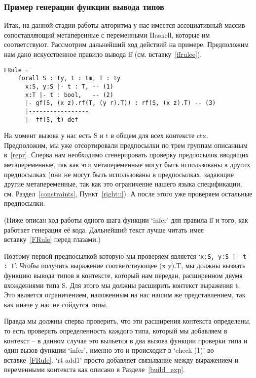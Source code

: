 \subsubsection{Пример генерации функции вывода типов}
Итак, на данной стадии работы алгоритма у нас имеется ассоциативный массив сопоставляющий метаперенные с переменными Haskell, которые им соответствуют. Рассмотрим дальнейший ход действий на примере. Предположим нам дано искусственное правило вывода ff (см. вставку~\ref{ffrulee}).

\begin{lstlisting}[label={ffrulee}, caption={Искусственное правило вывода для конструкции ff},captionpos=b, frame=single, float, floatplacement=H]
FRule =
    forall S : ty, t : tm, T : ty
      x:S, y:S |- t : T, -- (1)
      x:T |- t : bool,   -- (2)
      |- gf(S, (x z).rf(T, (y r).T)) : rf(S, (x z).T) -- (3)
      |-----------------
      |- ff(S, t) def
\end{lstlisting}

На момент вызова у нас есть S и t в общем для всех контексте ctx. Предположим, мы уже отсортировали предпосылки по трем группам описанным в~\ref{repr}. Сперва нам необходимо сгенерировать проверку предпосылок вводящих метапеременные, так как эти метапеременные могут быть использованы в других предпосылках (они не могут быть использованы в предпосылках, задающие другие метапеременные, так как это ограничение нашего языка спецификации, см. Раздел~\ref{constraints}, Пункт~\ref{right::}). А после этого уже проверяем остальные предпосылки.

(Ниже описан ход работы одного шага функции `infer' для правила ff и того, как работает генерация её кода. Дальнейший текст лучше читать имея вставку~\ref{FRule} перед глазами.)

Поэтому первой предпосылкой которую мы проверяем является `\lstinline{x:S, y:S |- t : T}'. Чтобы получить выражение соответствующее (x y).T, мы должны вызвать функцию вывода типов в контексте, который нам передан, расширенном двумя вхождениями типа S. Для этого мы должны расширить контекст выражения t. Это является ограничением, наложенным на нас нашим же представлением, так как иначе у нас не сойдутся типы.

Правда мы должны сперва проверить, что эти расширения контекста определены, то есть проверять определенность каждого типа, который мы добавляем в контекст -- в данном случае это выльется в два вызова функции проверки типа и один вызов функции `infer', именно это и происходит в `check (1)' во вставке~\ref{FRule}. `rt add1' просто добавляет связывание между выражением и переменными контекста как описано в Разделе~\ref{build_exp}.

